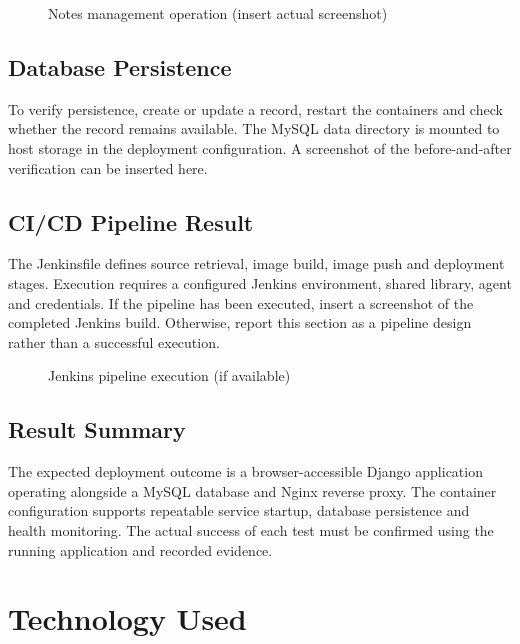 \documentclass[12pt,a4paper,oneside]{report}
\begin{document}
\begin{figure}[H]
\centering
{}
\caption{Notes management operation (insert actual screenshot)}
\label{fig:notes}
\end{figure}

\section{Database Persistence}
To verify persistence, create or update a record, restart the containers and check whether the record remains available. The MySQL data directory is mounted to host storage in the deployment configuration. A screenshot of the before-and-after verification can be inserted here.

\section{CI/CD Pipeline Result}
The Jenkinsfile defines source retrieval, image build, image push and deployment stages. Execution requires a configured Jenkins environment, shared library, agent and credentials. If the pipeline has been executed, insert a screenshot of the completed Jenkins build. Otherwise, report this section as a pipeline design rather than a successful execution.

\begin{figure}[H]
\centering
{}
\caption{Jenkins pipeline execution (if available)}
\label{fig:jenkins-result}
\end{figure}

\section{Result Summary}
The expected deployment outcome is a browser-accessible Django application operating alongside a MySQL database and Nginx reverse proxy. The container configuration supports repeatable service startup, database persistence and health monitoring. The actual success of each test must be confirmed using the running application and recorded evidence.

\chapter{Technology Used}
\end{document}
